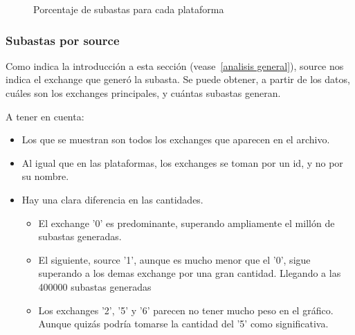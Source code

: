 \documentclass[a4paper, 12pt]{article}
\begin{document}
	\FloatBarrier
		\begin{figure}
			\centering
		   	\caption{Porcentaje de subastas para cada plataforma}
			\label{subastasSOcantidades}
		\end{figure}
	\FloatBarrier

	\subsubsection{Subastas por source}
	 Como indica la introducción a esta sección (vease~\ref{analisis general}), source nos indica el exchange que generó la subasta. Se puede obtener, a partir de los datos, cuáles son los exchanges principales, y cuántas subastas generan.

	 A tener en cuenta:
	\begin{itemize}
		\item Los que se muestran son todos los exchanges que aparecen en el archivo.
		\item Al igual que en las plataformas, los exchanges se toman por un id, y no por su nombre.
		\item Hay una clara diferencia en las cantidades.
		\begin{itemize}
			\item El exchange '0' es predominante, superando ampliamente el millón de subastas generadas.
			\item El siguiente, source '1', aunque es mucho menor que el '0', sigue superando a los demas exchange por una gran cantidad. Llegando a las 400000 subastas generadas
			\item Los exchanges '2', '5' y '6' parecen no tener mucho peso en el gráfico. Aunque quizás podría tomarse la cantidad del '5' como significativa.
		\end{itemize}
	\end{itemize}
\end{document}
